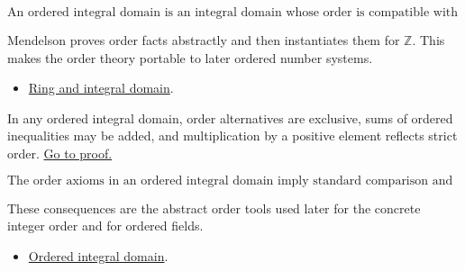 \begin{remark*}
\[
  \text{An ordered integral domain is an integral domain whose order is
  compatible with addition and positive multiplication.}
\]
\end{remark*}

\begin{remark*}[Interpretation]
Mendelson proves order facts abstractly and then instantiates them for
\(\mathbb{Z}\). This makes the order theory portable to later ordered
number systems.
\end{remark*}

\begin{dependencies}
\begin{itemize}
  \item \hyperref[def:men-ring-integral-domain]{Ring and integral domain}.
\end{itemize}
\end{dependencies}

\begin{theorem}
\label{thm:men-order-axiom-consequences}
In any ordered integral domain, order alternatives are exclusive, sums of
ordered inequalities may be added, and multiplication by a positive element
reflects strict order.
\hyperref[prf:men-order-axiom-consequences]{Go to proof.}
\end{theorem}

\begin{remark*}
\[
  \text{The order axioms in an ordered integral domain imply standard
  comparison and cancellation consequences.}
\]
\end{remark*}

\begin{remark*}[Interpretation]
These consequences are the abstract order tools used later for the concrete
integer order and for ordered fields.
\end{remark*}

\begin{dependencies}
\begin{itemize}
  \item \hyperref[def:men-ordered-integral-domain]{Ordered integral domain}.
\end{itemize}
\end{dependencies}

